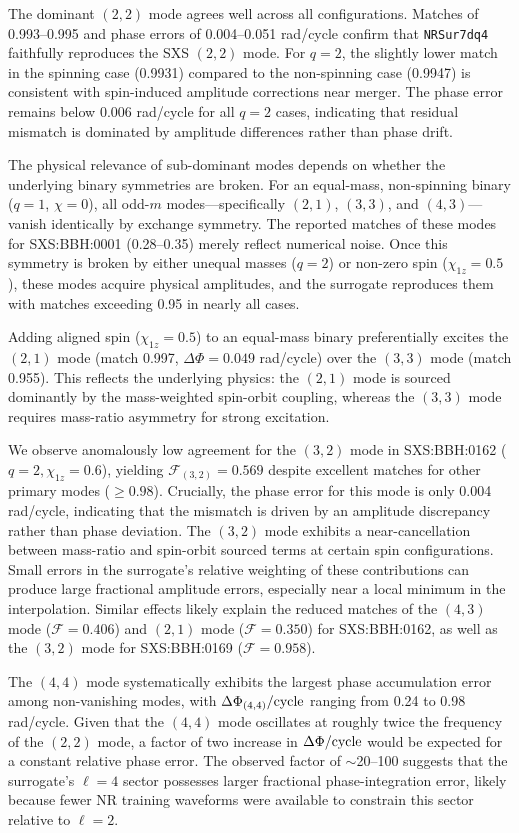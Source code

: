 \documentclass[%
 reprint,
superscriptaddress,
 amsmath,amssymb,
 aps,
]{revtex4-2}
\begin{document}
The dominant $(2,2)$ mode agrees well across all configurations. Matches of 0.993–0.995 and phase errors of 0.004–0.051 rad/cycle confirm that \texttt{NRSur7dq4} faithfully reproduces the SXS $(2,2)$ mode. For $q=2$, the slightly lower match in the spinning case (0.9931) compared to the non-spinning case (0.9947) is consistent with spin-induced amplitude corrections near merger. The phase error remains below 0.006 rad/cycle for all $q=2$ cases, indicating that residual mismatch is dominated by amplitude differences rather than phase drift.

The physical relevance of sub-dominant modes depends on whether the underlying binary symmetries are broken. For an equal-mass, non-spinning binary ($q = 1$, $\chi = 0$), all odd-$m$ modes—specifically $(2,1)$, $(3,3)$, and $(4,3)$—vanish identically by exchange symmetry. The reported matches of these modes for SXS:BBH:0001 (0.28–0.35) merely reflect numerical noise. Once this symmetry is broken by either unequal masses ($q = 2$) or non-zero spin ($\chi_{1z} = 0.5$), these modes acquire physical amplitudes, and the surrogate reproduces them with matches exceeding 0.95 in nearly all cases.

Adding aligned spin ($\chi_{1z} = 0.5$) to an equal-mass binary preferentially excites the $(2,1)$ mode (match 0.997, $\Delta\Phi = 0.049$ rad/cycle) over the $(3,3)$ mode (match 0.955). This reflects the underlying physics: the $(2,1)$ mode is sourced dominantly by the mass-weighted spin-orbit coupling, whereas the $(3,3)$ mode requires mass-ratio asymmetry for strong excitation.

We observe anomalously low agreement for the $(3,2)$ mode in SXS:BBH:0162 ($q=2, \chi_{1z}=0.6$), yielding $\mathcal{F}_{(3,2)} = 0.569$ despite excellent matches for other primary modes ($\geq 0.98$). Crucially, the phase error for this mode is only 0.004 rad/cycle, indicating that the mismatch is driven by an amplitude discrepancy rather than phase deviation. The $(3,2)$ mode exhibits a near-cancellation between mass-ratio and spin-orbit sourced terms at certain spin configurations. Small errors in the surrogate's relative weighting of these contributions can produce large fractional amplitude errors, especially near a local minimum in the interpolation. Similar effects likely explain the reduced matches of the $(4,3)$ mode ($\mathcal{F} = 0.406$) and $(2,1)$ mode ($\mathcal{F} = 0.350$) for SXS:BBH:0162, as well as the $(3,2)$ mode for SXS:BBH:0169 ($\mathcal{F} = 0.958$).

The $(4,4)$ mode systematically exhibits the largest phase accumulation error among non-vanishing modes, with $\Delta\Phi_{(4,4)}/{\rm cycle}$ ranging from 0.24 to 0.98 rad/cycle. Given that the $(4,4)$ mode oscillates at roughly twice the frequency of the $(2,2)$ mode, a factor of two increase in $\Delta\Phi/{\rm cycle}$ would be expected for a constant relative phase error. The observed factor of $\sim$20–100 suggests that the surrogate's $\ell = 4$ sector possesses larger fractional phase-integration error, likely because fewer NR training waveforms were available to constrain this sector relative to $\ell = 2$.
\end{document}
